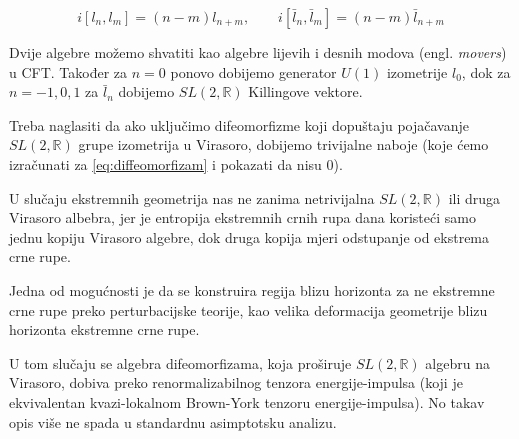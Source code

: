 \begin{equation}
i[l_n,l_m]=(n-m)l_{n+m},\qquad i[\bar{l}_n,\bar{l}_m]=(n-m)\bar{l}_{n+m}
\end{equation}

Dvije algebre možemo shvatiti kao algebre lijevih i desnih modova (engl. \textit{movers}) u CFT. Također za $n=0$ ponovo dobijemo generator $U(1)$ izometrije $l_0$, dok za $n=-1,0,1$ za $\bar{l}_n$ dobijemo $SL(2,\mathbb{R})$ Killingove vektore.

Treba naglasiti da ako uključimo difeomorfizme koji dopuštaju pojačavanje $SL(2,\mathbb{R})$ grupe izometrija u Virasoro, dobijemo trivijalne naboje (koje ćemo izračunati za \eqref{eq:diffeomorfizam} i pokazati da nisu 0).

\noindent U slučaju ekstremnih geometrija nas ne zanima netrivijalna $SL(2,\mathbb{R})$ ili druga Virasoro albebra, jer je entropija ekstremnih crnih rupa dana koristeći samo jednu kopiju Virasoro algebre, dok druga kopija mjeri odstupanje od ekstrema crne rupe.

\noindent Jedna od mogućnosti je da se konstruira regija blizu horizonta za ne ekstremne crne rupe preko perturbacijske teorije, kao velika deformacija geometrije blizu horizonta ekstremne crne rupe.

\noindent U tom slučaju se algebra difeomorfizama, koja proširuje $SL(2,\mathbb{R})$ algebru na Virasoro, dobiva preko renormalizabilnog tenzora energije-impulsa (koji je ekvivalentan kvazi-lokalnom Brown-York tenzoru energije-impulsa). No takav opis više ne spada u standardnu asimptotsku analizu.




